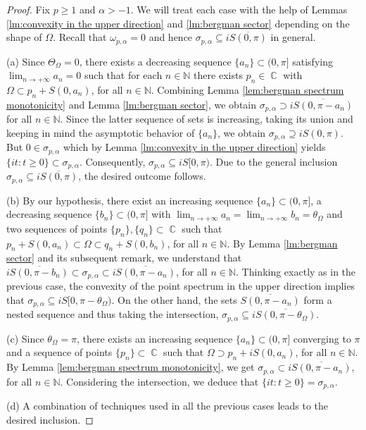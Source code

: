\documentclass[11pt]{amsart}
\numberwithin{equation}{section}
\theoremstyle{definition}
\DeclareMathOperator{\C}{\mathbb{C}}
\begin{document}
	\begin{proof}
		Fix $p\ge1$ and $\alpha>-1$. We will treat each case with the help of Lemmas \ref{lm:convexity in the upper direction} and \ref{lm:bergman sector} depending on the shape of $\Omega$. Recall that $\omega_{p,\alpha}=0$ and hence $\sigma_{p,\alpha}\subseteq i\overline{S(0,\pi)}$ in general.
		
		(a) Since $\Theta_\Omega=0$, there exists a decreasing sequence $\{a_n\}\subset(0,\pi]$ satisfying $\lim_{n\to+\infty}a_n=0$ such that for each $n\in\mathbb{N}$ there exists $p_n\in\C$ with $\Omega\subset p_n+S(0,a_n)$, for all $n\in\mathbb{N}$. Combining Lemma \ref{lem:bergman spectrum monotonicity} and Lemma \ref{lm:bergman sector}, we obtain $\sigma_{p,\alpha}\supset i\overline{S(0,\pi-a_n)}$ for all $n\in\mathbb{N}$. Since the latter sequence of sets is increasing, taking its union and keeping in mind the asymptotic behavior of $\{a_n\}$, we obtain $\sigma_{p,\alpha}\supseteq iS(0,\pi)$. But $0\in \sigma_{p,\alpha}$ which by Lemma \ref{lm:convexity in the upper direction} yields $\{it:t\ge0\}\subset\sigma_{p,\alpha}$. Consequently, $\sigma_{p,\alpha}\subseteq i S[0,\pi)$. Due to the general inclusion $\sigma_{p,\alpha}\subseteq i\overline{S(0,\pi)}$, the desired outcome follows.
		
		(b) By our hypothesis, there exist an increasing sequence $\{a_n\}\subset(0,\pi]$, a decreasing sequence $\{b_n\}\subset(0,\pi]$ with $\lim_{n\to+\infty}a_n=\lim_{n\to+\infty}b_n=\theta_\Omega$ and two sequences of points $\{p_n\}, \{q_n\}\subset\C$ such that $p_n+S(0,a_n) \subset \Omega \subset q_n+S(0,b_n)$, for all $n\in\mathbb{N}$. By Lemma \ref{lm:bergman sector} and its subsequent remark, we understand that $i\overline{S(0,\pi-b_n)}\subset\sigma_{p,\alpha}\subset i\overline{S(0,\pi-a_n)}$, for all $n\in\mathbb{N}$. Thinking exactly as in the previous case, the convexity of the point spectrum in the upper direction implies that $\sigma_{p,\alpha}\subseteq iS[0,\pi-\theta_\Omega)$. On the other hand, the sets $\overline{S(0,\pi-a_n)}$ form a nested sequence and thus taking the intersection, $\sigma_{p,\alpha}\subseteq i\overline{S(0,\pi-\theta_\Omega)}$.
		
		(c) Since $\theta_\Omega=\pi$, there exists an increasing sequence $\{a_n\}\subset(0,\pi]$ converging to $\pi$ and a sequence of points $\{p_n\}\subset\C$ such that $\Omega\supset p_n+iS(0,a_n)$, for all $n\in\mathbb{N}$. By Lemma \ref{lem:bergman spectrum monotonicity}, we get $\sigma_{p,\alpha}\subset i\overline{S(0,\pi-a_n)}$, for all $n\in\mathbb{N}$. Considering the intersection, we deduce that $\{it:t\ge0\}=\sigma_{p,\alpha}$.
		
		(d) A combination of techniques used in all the previous cases leads to the desired inclusion.
	\end{proof}
	
\end{document}
